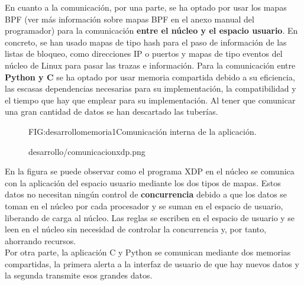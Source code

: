 En cuanto a la comunicación, por una parte, se ha optado por usar los mapas BPF (ver más información sobre mapas BPF en el anexo manual del programador) para la comunicación\textbf{ entre el núcleo y el espacio usuario}. En concreto, se han usado mapas de tipo hash para el paso de información de las listas de bloqueo, como direcciones IP o puertos y mapas de tipo eventos del núcleo de Linux para pasar las trazas e información.
Para la comunicación entre \textbf{Python y C} se ha optado por usar memoria compartida debido a su eficiencia, las escasas dependencias necesarias para su implementación, la compatibilidad y el tiempo que hay que emplear para su implementación. Al tener que comunicar una gran cantidad de datos se han descartado las tuberías.

\begin{figure}[Comunicación interna de la aplicación.]{FIG:desarrollomemoria1}{Comunicación interna de la aplicación.}
  \begin{image}{}{}{desarrollo/comunicacionxdp.png}
  \end{image}
\end{figure}
En la figura se puede observar como el programa XDP en el núcleo se comunica con la aplicación del espacio usuario mediante los dos tipos de mapas. Estos datos no necesitan ningún control de \textbf{concurrencia} debido a que los datos se toman en el núcleo por cada procesador y se suman en el espacio de usuario, liberando de carga al núcleo. Las reglas se escriben en el espacio de usuario y se leen en el núcleo sin necesidad de controlar la concurrencia y, por tanto, ahorrando recursos.
\\Por otra parte, la aplicación C y Python se comunican mediante dos memorias compartidas, la primera alerta a la interfaz de usuario de que hay nuevos datos y la segunda transmite esos grandes datos.

